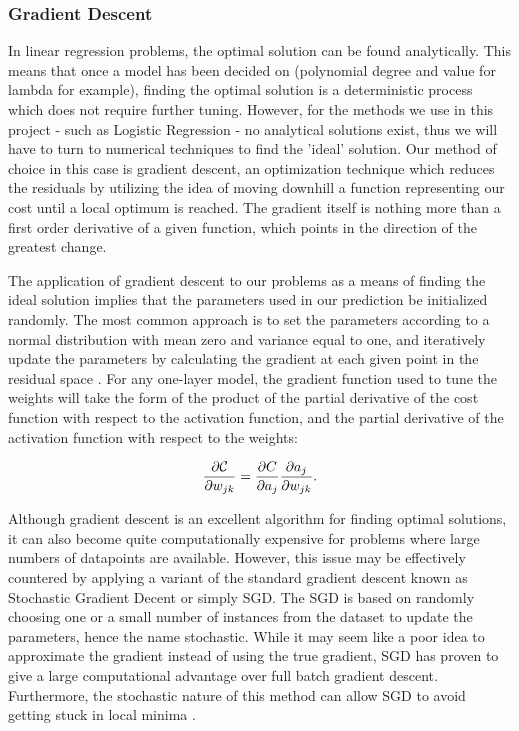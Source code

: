 \documentclass[onecolumn,10pt,cleanfoot]{asme2ej}
\begin{document}
\subsubsection{Gradient Descent}

In linear regression problems, the optimal solution can be found analytically. This means that once a model has been decided on (polynomial degree and value for lambda for example), finding the optimal solution is a deterministic process which does not require further tuning. However, for the methods we use in this project - such as Logistic Regression - no analytical solutions exist, thus we will have to turn to numerical techniques to find the 'ideal' solution. Our method of choice in this case is gradient descent, an optimization technique which reduces the residuals by utilizing the idea of moving downhill a function representing our cost until a local optimum is reached. The gradient itself is nothing more than a first order derivative of a given function, which points in the direction of the greatest change. 

The application of gradient descent to our problems as a means of finding the ideal solution implies that the parameters used in our prediction be initialized randomly. The most common approach is to set the parameters according to a normal distribution with mean zero and variance equal to one, and iteratively update the parameters by calculating the gradient at each given point in the residual space \cite[preface p. x]{dds}. For any one-layer model, the gradient function used to tune the weights will take the form of the product of the partial derivative of the cost function with respect to the activation function, and the partial derivative of the activation function with respect to the weights: 

\begin{equation}
\frac{\partial{\cal C}}{\partial w_{jk}}  = \frac{\partial C}{\partial a_{j}}\frac{\partial a_j}{\partial w_{jk}}.
\end{equation}

Although gradient descent is an excellent algorithm for finding optimal solutions, it can also become quite computationally expensive for problems where large numbers of datapoints are available. However, this issue may be effectively countered by applying a variant of the standard gradient descent known as Stochastic Gradient Decent or simply SGD. The SGD is based on randomly choosing one or a small number of instances from the dataset to update the parameters, hence the name stochastic. While it may seem like a poor idea to approximate the gradient instead of using the true gradient, SGD has proven to give a large computational advantage over full batch gradient descent. Furthermore, the stochastic nature of this method can allow SGD to avoid getting stuck in local minima \cite[46]{sr}.
\end{document}
